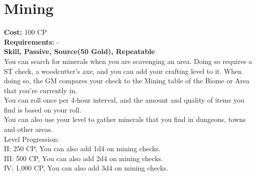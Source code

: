 \section{Mining}\label{perk:mining}
\textbf{Cost:} 100 CP\\
\textbf{Requirements:} -\\
\textbf{Skill, Passive, Source(50 Gold), Repeatable}\\
You can search for minerals when you are scavenging an area.
Doing so requires a ST check, a woodcutter's axe, and you can add your crafting level to it.
When doing so, the GM compares your check to the Mining table of the Biome or Area that you're currently in.\\
You can roll once per 4-hour interval, and the amount and quality of items you find is based on your roll.\\
You can also use your level to gather minerals that you find in dungeons, towns and other areas.
\\
Level Progression:\\
II: 250 CP, You can also add 1d4 on mining checks.\\
III: 500 CP, You can also add 2d4 on mining checks.\\
IV: 1,000 CP, You can also add 3d4 on mining checks.\\